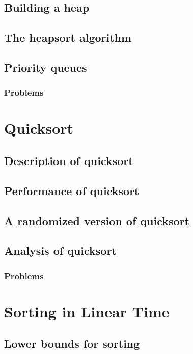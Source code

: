 \documentclass[fontsize=12pt,paper=a4]{book}
\begin{document}
\section{Building a heap}

\section{The heapsort algorithm}

\section{Priority queues}

\subsection*{Problems}


\chapter{Quicksort}

\section{Description of quicksort}

\section{Performance of quicksort}

\section{A randomized version of quicksort}

\section{Analysis of quicksort}

\subsection*{Problems}


\chapter{Sorting in Linear Time}

\section{Lower bounds for sorting}
\end{document}
